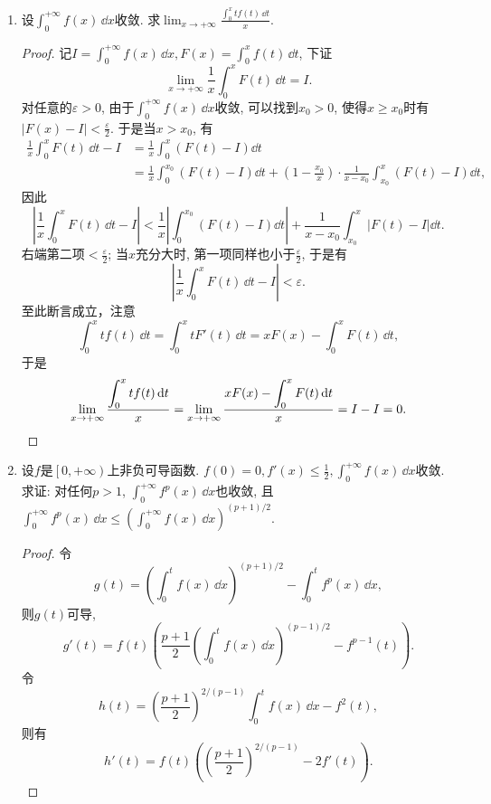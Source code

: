 \begin{b}
\begin{enumerate}
\begin{proof}
\[\begin{split}
+\int_{1}^{1/(2\sqrt{x})}\left(2-\frac{1}{u^2}\right)\exp\left(u^2\right)\dd u\right)\\
&=\frac{1}{\sqrt{x}}\left(\int_{0}^{1}\exp\left(u^2\right)\dd u
+\int_{1}^{1/(2\sqrt{x})}\frac{\dd}{\dd u}\frac{\exp(u^2)}{u}\dd u\right)\\
&\leqslant\frac{1}{\sqrt{x}}\left(C+2\sqrt{x}\exp\left(\frac{1}{4x}\right)\right),
\end{split}\]
其中\(C=\int_{0}^{1}\ee^{u^2}\dd u\). 于是\(F(x,1)\leqslant\frac{C}{\sqrt{x}}\exp\left(-\frac{1}{4x}\right)+2\), 
右侧当\(x\rightarrow 0^+\)时有有限极限, 并且结合\(8.4.\mathcal{A}\)第\(4\)题可知\(f(x)>0\). 结论即证.
\end{proof}
\item 设\(\int_{0}^{+\infty}f(x)\,\dd x\)收敛. 求\(\lim_{x\rightarrow+\infty}\frac{\displaystyle\int_{0}^{x}tf(t)\,\dd t}{x}\).
\begin{proof}
记\(I=\int_{0}^{+\infty}f(x)\,\dd x,F(x)=\int_{0}^{x}f(t)\,\dd t\), 下证
\[\lim_{x\rightarrow+\infty}\frac{1}{x}\int_{0}^{x}F(t)\,\dd t=I.\]
对任意的\(\varepsilon>0\), 由于\(\int_{0}^{+\infty}f(x)\,\dd x\)收敛, 
可以找到\(x_0>0\), 使得\(x\geqslant x_0\)时有
\(\left|F(x)-I\right|<\frac{\varepsilon}{2}\). 于是当\(x>x_0\), 有
\[\begin{split}
\frac{1}{x}\int_{0}^{x}F(t)\,\dd t-I&=\frac{1}{x}\int_{0}^{x}\left(F(t)-I\right)\dd t\\
&=\frac{1}{x}\int_{0}^{x_0}\left(F(t)-I\right)\dd t+\left(1-\frac{x_0}{x}\right)\cdot\frac{1}{x-x_0}\int_{x_0}^{x}\left(F(t)-I\right)\dd t,
\end{split}\]因此
\[\left|\frac{1}{x}\int_{0}^{x}F(t)\,\dd t-I\right|
<\frac{1}{x}\left|\int_{0}^{x_0}\left(F(t)-I\right)\dd t\right|
+\frac{1}{x-x_0}\int_{x_0}^{x}\left|F(t)-I\right|\dd t.\]
右端第二项\(<\frac{\varepsilon}{2}\); 当\(x\)充分大时, 第一项同样也小于\(\frac{\varepsilon}{2}\), 于是有
\[\left|\frac{1}{x}\int_{0}^{x}F(t)\,\dd t-I\right|<\varepsilon.\]
至此断言成立，注意\[\int_{0}^{x}tf(t)\,\dd t=\int_{0}^{x}tF'(t)\,\dd t=xF(x)-\int_{0}^{x}F(t)\,\dd t,\]
于是\[\lim_{x\rightarrow+\infty}\frac{\displaystyle\int_{0}^{x}tf(t)\,{\rm d} t}{x}
=\lim_{x\rightarrow+\infty}\frac{\displaystyle xF(x)-\int_{0}^{x}F(t)\,{\rm d} t}{x}=I-I=0.\qedhere\]
\end{proof}
\item 设\(f\)是\(\left[0,+\infty\right)\)上非负可导函数. 
\(f(0)=0,f'(x)\leqslant\frac{1}{2},\int_{0}^{+\infty}f(x)\,\dd x\)收敛. 
求证: 对任何\(p>1\), \(\int_{0}^{+\infty}f^p(x)\,\dd x\)也收敛, 
且\(\int_{0}^{+\infty}f^p(x)\,\dd x\leqslant\left(\int_{0}^{+\infty}f(x)\,\dd x\right)^{(p+1)/2}\).
\begin{proof}
令\[g(t)=\left(\int_{0}^{t}f(x)\,\dd x\right)^{(p+1)/2}-\int_{0}^{t}f^p(x)\,\dd x,\]
则\(g(t)\)可导,
\[g'(t)=f(t)\left(\frac{p+1}{2}\left(\int_{0}^{t}f(x)\,\dd x\right)^{(p-1)/2}-f^{p-1}(t)\right).\]
令\[h(t)=\left(\frac{p+1}{2}\right)^{2/(p-1)}\int_{0}^{t}f(x)\,\dd x-f^2(t),\]
则有\[h'(t)=f(t)\left(\left(\frac{p+1}{2}\right)^{2/(p-1)}-2f'(t)\right).\]


\end{proof}
\end{enumerate}
\end{b}
